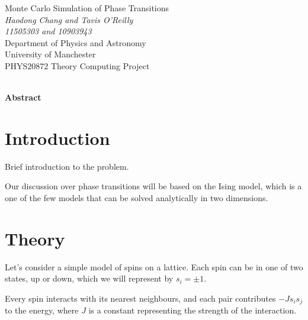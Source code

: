 \documentclass[11pt]{article}
\begin{document}
	
	\begin{titlepage}
		\begin{center}
			{\Huge Monte Carlo Simulation of Phase Transitions}\\[0.5cm]
			\textit{Haodong Chang and Tavis O'Reilly}\\[0.3cm]
			\textit{11505303 and 10903943}\\[0.3cm]
			Department of Physics and Astronomy\\[0.3cm]
			University of Manchester\\[0.3cm]
			PHYS20872 Theory Computing Project\\[0.3cm]
			\shortmonthname[\the\month]  \the\year \\[4cm]
			
		\end{center}
		
		{\Large \textbf{Abstract}}\\[0.3cm]
		
		
	\end{titlepage}
	
	\clearpage
	\setcounter{page}{2}
	
	\newpage
	
	\section{Introduction}
	
	Brief introduction to the problem.

	Our discussion over phase transitions will be based on the Ising model, 
	which is a one of the few models that can be solved analytically in two dimensions.

	
	\section{Theory}

	Let's consider a simple model of spins on a lattice.
	Each spin can be in one of two states, up or down, which we will represent by $s_i = \pm 1$.

	Every spin interacts with its nearest neighbours, and each pair contributes $-J s_i s_j$ to the energy, 
	where $J$ is a constant representing the strength of the interaction.
\end{document}
